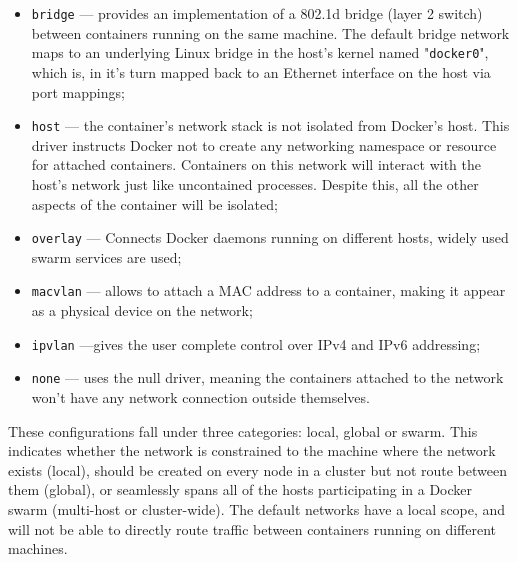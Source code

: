 \begin{itemize}
    \item \texttt{bridge} --- provides an implementation of a 802.1d bridge (layer 2 switch) between containers running on the same machine. The default bridge network maps to an underlying Linux bridge in the host's kernel named "\texttt{docker0}", which is, in it's turn mapped back to an Ethernet interface on the host via port mappings;
    \item \texttt{host} --- the container's network stack is not isolated from Docker's host. This driver instructs Docker not to create any networking namespace or resource for attached containers. Containers on this network will interact with the host's network just like uncontained processes. Despite this, all the other aspects of the container will be isolated;
    \item \texttt{overlay} --- Connects Docker daemons running on different hosts, widely used swarm services are used;
    \item \texttt{macvlan} --- allows to attach a \acs{MAC} address to a container, making it appear as a physical device on the network;
    \item \texttt{ipvlan} ---gives the user complete control over IPv4 and IPv6 addressing;
    \item \texttt{none} --- uses the null driver, meaning the containers attached to the network won't have any network connection outside themselves.
\end{itemize}

These configurations fall under three categories: local, global or swarm. This indicates whether the network is constrained to the machine where the network exists (local), should be created on every node in a cluster but not route between them (global), or seamlessly spans all of the hosts participating in a Docker swarm (multi-host or cluster-wide). The default networks have a local scope, and will not be able to directly route traffic between containers running on different machines.